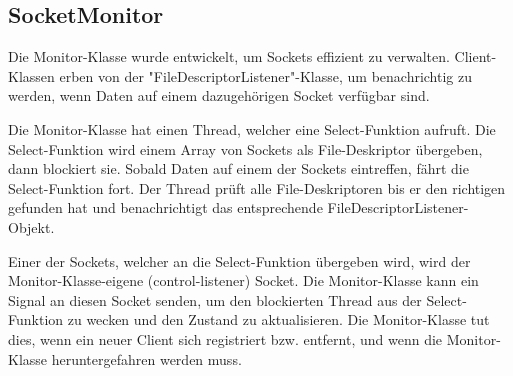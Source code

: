 \subsection{SocketMonitor}

Die Monitor-Klasse wurde entwickelt, um Sockets effizient zu verwalten. Client-Klassen erben von der "FileDescriptorListener"-Klasse, um benachrichtig zu werden, wenn Daten auf einem dazugehörigen Socket verfügbar sind.

Die Monitor-Klasse hat einen Thread, welcher eine Select-Funktion aufruft. Die Select-Funktion wird einem Array von Sockets als File-Deskriptor übergeben, dann blockiert sie. Sobald Daten auf einem der Sockets eintreffen, fährt die Select-Funktion fort. Der Thread prüft alle File-Deskriptoren bis er den richtigen gefunden hat und benachrichtigt das entsprechende FileDescriptorListener-Objekt.

Einer der Sockets, welcher an die Select-Funktion übergeben wird, wird der Monitor-Klasse-eigene (control-listener) Socket. Die Monitor-Klasse kann ein Signal an diesen Socket senden, um den blockierten Thread aus der Select-Funktion zu wecken und den Zustand zu aktualisieren. Die Monitor-Klasse tut dies, wenn ein neuer Client sich registriert bzw. entfernt, und wenn die Monitor-Klasse heruntergefahren werden muss.
